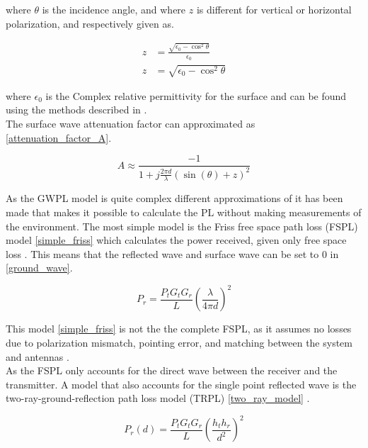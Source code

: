 where $\theta$ is the incidence angle, and where $z$ is different for vertical or horizontal polarization, and respectively given as.

\begin{align}
z &= \frac{\sqrt{\epsilon_{0}-\cos^{2}\theta}}{\epsilon_{0}} \\
z &= \sqrt{\epsilon_{0}-\cos^{2}\theta}
\end{align}

where $\epsilon_{0}$ is the Complex relative permittivity for the surface and can be found using the methods described in \cite{Kim}.\\
The surface wave attenuation factor can approximated as \eqref{attenuation_factor_A}\cite{Chong, Bullington}. 


\begin{equation}
A \approx \frac{-1}{1+j\frac{2\pi d}{\lambda}(\sin(\theta)+z)^{2}}
\label{attenuation_factor_A}
\end{equation}


As the GWPL model is quite complex different approximations of it has been made that makes it possible to calculate the PL without making measurements of the environment. The most simple model is the Friss free space path loss (FSPL) model \eqref{simple_friss} which calculates the power received, given only free space loss \cite{Chong}. This means that the reflected wave and surface wave can be set to 0 in \eqref{ground_wave}. 

\begin{equation}
P_r = \frac{P_t G_t G_r}{L} \left(\frac{\lambda}{4 \pi d}\right)^2
\label{simple_friss}
\end{equation}

This model \eqref{simple_friss} is not the the complete FSPL, as it assumes no losses due to polarization mismatch, pointing error, and matching between the system and antennas \cite{full_friss}. \\



As the FSPL only accounts for the direct wave between the receiver and the transmitter. A model that also accounts for the single point reflected wave is the two-ray-ground-reflection path loss model (TRPL) \eqref{two_ray_model} \cite{two_ray}. 

\begin{equation}
P_r(d) = \frac{P_t G_t G_r }{L}\left(\frac{h_t h_r}{d^2}\right)^2
\label{two_ray_model}
\end{equation}

